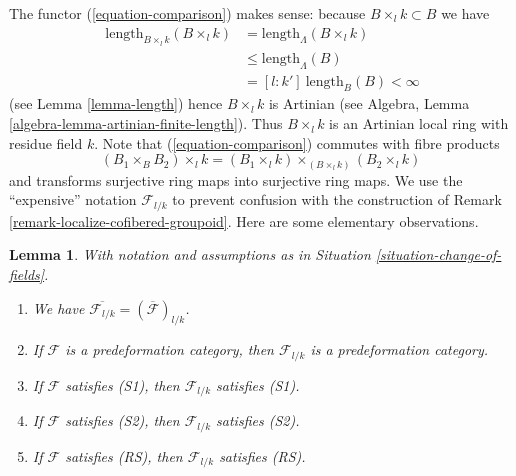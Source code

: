 \documentclass{stacks-project}
\theoremstyle{plain}
\newtheorem{lemma}[subsection]{Lemma}
\theoremstyle{definition}
\theoremstyle{remark}
\numberwithin{equation}{subsection}
\begin{document}
\noindent
The functor (\ref{equation-comparison}) makes sense:
because $B \times_l k \subset B$ we have
\begin{align*}
[k : k']\ \text{length}_{B \times_l k}(B \times_l k) & =
\text{length}_\Lambda(B \times_l k) \\
& \leq \text{length}_\Lambda(B) \\
& = [l : k']\ \text{length}_B(B) < \infty
\end{align*}
(see Lemma \ref{lemma-length}) hence $B \times_l k$ is Artinian
(see Algebra, Lemma \ref{algebra-lemma-artinian-finite-length}).
Thus $B \times_l k$ is an Artinian local ring with
residue field $k$. Note that (\ref{equation-comparison})
commutes with fibre products
$$
(B_1 \times_B B_2) \times_l k =
(B_1 \times_l k) \times_{(B \times_l k)} (B_2 \times_l k)
$$
and transforms surjective ring maps into surjective ring maps.
We use the ``expensive'' notation $\mathcal{F}_{l/k}$ to prevent confusion
with the construction of Remark \ref{remark-localize-cofibered-groupoid}.
Here are some elementary observations.

\begin{lemma}
\label{lemma-elementary-properties-change-of-field}
With notation and assumptions as in Situation \ref{situation-change-of-fields}.
\begin{enumerate}
\item We have $\overline{\mathcal{F}_{l/k}} = (\overline{\mathcal{F}})_{l/k}$.
\item If $\mathcal{F}$ is a predeformation category, then $\mathcal{F}_{l/k}$
is a predeformation category.
\item If $\mathcal{F}$ satisfies (S1), then $\mathcal{F}_{l/k}$
satisfies (S1).
\item If $\mathcal{F}$ satisfies (S2), then $\mathcal{F}_{l/k}$
satisfies (S2).
\item If $\mathcal{F}$ satisfies (RS), then $\mathcal{F}_{l/k}$
satisfies (RS).
\end{enumerate}
\end{lemma}
\end{document}
